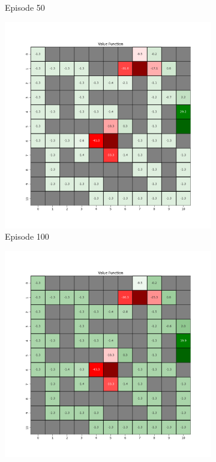 \documentclass{assignment}
\begin{document}
\begin{figure}[H]
\begin{subfigure}{0.3\textwidth}
    \caption{Episode 50}
    \end{subfigure}\hfill
    \begin{subfigure}{0.3\textwidth}
        \includegraphics[width=\textwidth]{figures/value_td/gamma_sweep/value_function_alpha_0.1_gamma_0.25_epsilon_0.2_iteration_100.png}
    \caption{Episode 100}
    \end{subfigure}
    \begin{subfigure}{0.3\textwidth}
        \includegraphics[width=\textwidth]{figures/value_td/gamma_sweep/value_function_alpha_0.1_gamma_0.25_epsilon_0.2_iteration_1000.png}

\end{subfigure}
\end{figure}
\end{document}
